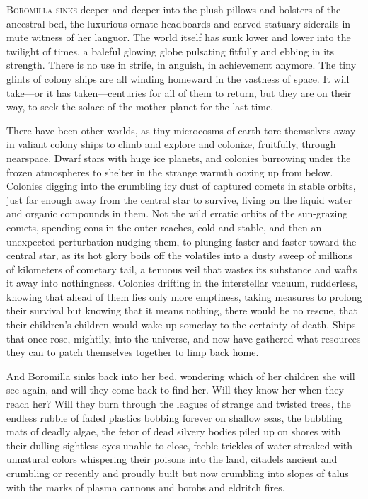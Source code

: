 
\lettrine{B}{oromilla sinks} deeper and deeper into the plush pillows and bolsters of
the ancestral bed, the luxurious ornate headboards and carved statuary
siderails in mute witness of her languor. The world itself has sunk
lower and lower into the twilight of times, a baleful glowing globe
pulsating fitfully and ebbing in its strength. There is no use in
strife, in anguish, in achievement anymore. The tiny glints of colony
ships are all winding homeward in the vastness of space.
It will take---or it has taken---centuries for all of them to return, but they are on
their way, to seek the solace of the mother planet for the last time.

There have been other worlds, as tiny microcosms of earth tore
themselves away in valiant colony ships to climb and explore and
colonize, fruitfully, through nearspace. Dwarf stars with huge ice
planets, and colonies burrowing under the frozen atmospheres to shelter
in the strange warmth oozing up from below. Colonies digging into the
crumbling icy dust of captured comets in stable orbits, just far enough
away from the central star to survive, living on the liquid water and
organic compounds in them. Not the wild erratic orbits of the
sun-grazing comets, spending eons in the outer reaches, cold and stable,
and then an unexpected perturbation nudging them, to plunging faster and
faster toward the central star, as its hot glory boils off the volatiles
into a dusty sweep of millions of kilometers of cometary tail, a tenuous
veil that wastes its substance and wafts it away into nothingness.
Colonies drifting in the interstellar vacuum, rudderless, knowing that
ahead of them lies only more emptiness, taking measures to prolong their
survival but knowing that it means nothing, there would be no rescue,
that their children's children would wake up someday to the certainty of
death. Ships that once rose, mightily, into the universe, and now have
gathered what resources they can to patch themselves together to limp
back home.

And Boromilla sinks back into her bed, wondering which of her children
she will see again, and will they come back to find her. Will they know
her when they reach her? Will they burn through the leagues of strange
and twisted trees, the endless rubble of faded plastics bobbing forever
on shallow seas, the bubbling mats of deadly algae, the fetor of dead
silvery bodies piled up on shores with their dulling sightless eyes
unable to close, feeble trickles of water streaked with unnatural colors
whispering their poisons into the land, citadels ancient and crumbling
or recently and proudly built but now crumbling into slopes of talus
with the marks of plasma cannons and bombs and eldritch fires.


